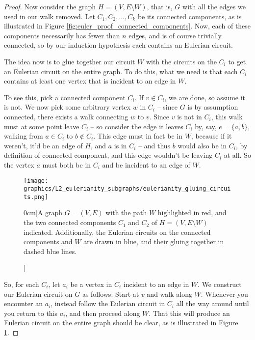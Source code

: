\documentclass[nobib]{tufte-handout}
\begin{document}
\begin{theorem}[Euler (1736)]
\begin{proof}
    Now consider the graph $H = (V, E \setminus W)$, that is, $G$ with all the edges we used in our walk removed. Let $C_1, C_2, \ldots, C_k$ be its connected components, as is illustrated in Figure \ref{fig:euler_proof_connected_components}. Now, each of these components necessarily has fewer than $n$ edges, and is of course trivially connected, so by our induction hypothesis each contains an Eulerian circuit.

    The idea now is to glue together our circuit $W$ with the circuits on the $C_i$ to get an Eulerian circuit on the entire graph. To do this, what we need is that each $C_i$ contains at least one vertex that is incident to an edge in $W$.

    To see this, pick a connected component $C_i$. If $v \in C_i$, we are done, so assume it is not. We now pick some arbitrary vertex $w$ in $C_i$ -- since $G$ is by assumption connected, there exists a walk connecting $w$ to $v$. Since $v$ is not in $C_i$, this walk must at some point leave $C_i$ -- so consider the edge it leaves $C_i$ by, say, $e = \{a,b\}$, walking from $a \in C_i$ to $b \not\in C_i$. This edge must in fact be in $W$, because if it weren't, it'd be an edge of $H$, and $a$ is in $C_i$ -- and thus $b$ would also be in $C_i$, by definition of connected component, and this edge wouldn't be leaving $C_i$ at all. So the vertex $a$ must both be in $C_i$ and be incident to an edge of $W$.

    \begin{figure}
      \centering
      \texttt{[image: graphics/L2\_eulerianity\_subgraphs/eulerianity\_gluing\_circuits.png]}
      \caption[][0cm]{A graph $G = (V,E)$ with the path $W$ highlighted in red, and the two connected components $C_1$ and $C_2$ of $H = (V, E \setminus W)$ indicated. Additionally, the Eulerian circuits on the connected components and $W$ are drawn in blue, and their gluing together in dashed blue lines.}
      \label{fig:gluing_eulerian_circuits}
    \end{figure}

    So, for each $C_i$, let $a_i$ be a vertex in $C_i$ incident to an edge in $W$. We construct our Eulerian circuit on $G$ as follows: Start at $v$ and walk along $W$. Whenever you encounter an $a_i$, instead follow the Eulerian circuit in $C_i$ all the way around until you return to this $a_i$, and then proceed along $W$. That this will produce an Eulerian circuit on the entire graph should be clear, as is illustrated in Figure \ref{fig:gluing_eulerian_circuits}.
  \end{proof}
\end{theorem}
\end{document}
